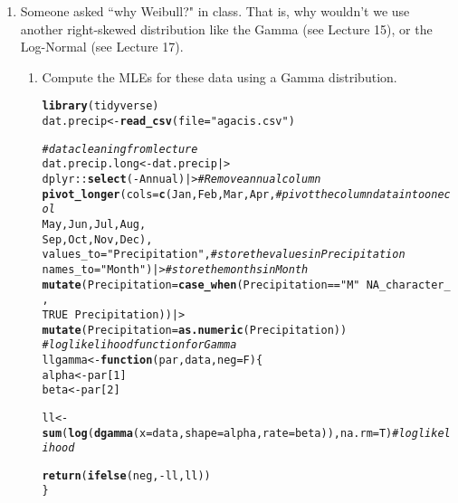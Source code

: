 \documentclass{article}\usepackage[]{graphicx}\usepackage[]{xcolor}
\makeatletter
\newcommand{\hlnum}[1]{\textcolor[rgb]{0.686,0.059,0.569}{#1}}%
\newcommand{\hlsng}[1]{\textcolor[rgb]{0.192,0.494,0.8}{#1}}%
\newcommand{\hlcom}[1]{\textcolor[rgb]{0.678,0.584,0.686}{\textit{#1}}}%
\newcommand{\hlopt}[1]{\textcolor[rgb]{0,0,0}{#1}}%
\newcommand{\hldef}[1]{\textcolor[rgb]{0.345,0.345,0.345}{#1}}%
\newcommand{\hlkwa}[1]{\textcolor[rgb]{0.161,0.373,0.58}{\textbf{#1}}}%
\newcommand{\hlkwb}[1]{\textcolor[rgb]{0.69,0.353,0.396}{#1}}%
\newcommand{\hlkwc}[1]{\textcolor[rgb]{0.333,0.667,0.333}{#1}}%
\newcommand{\hlkwd}[1]{\textcolor[rgb]{0.737,0.353,0.396}{\textbf{#1}}}%
\newenvironment{kframe}{%
 \def\at@end@of@kframe{}%
 \ifinner\ifhmode%
  \def\at@end@of@kframe{\end{minipage}}%
  \begin{minipage}{\columnwidth}%
 \fi\fi%
 \def\FrameCommand##1{\hskip\@totalleftmargin \hskip-\fboxsep
 \colorbox{shadecolor}{##1}\hskip-\fboxsep
     \hskip-\linewidth \hskip-\@totalleftmargin \hskip\columnwidth}%
 \MakeFramed {\advance\hsize-\width
   \@totalleftmargin\z@ \linewidth\hsize
   \@setminipage}}%
 {\par\unskip\endMakeFramed%
 \at@end@of@kframe}
\newenvironment{knitrout}{}{} %
\makeatother
\begin{document}
\begin{enumerate}
  \item Someone asked ``why Weibull?" in class. That is, why wouldn't we use 
  another right-skewed distribution like the Gamma (see Lecture 15), or
  the Log-Normal (see Lecture 17).
  \begin{enumerate}
    \item Compute the MLEs for these data using a Gamma distribution. 
\begin{knitrout}\scriptsize
{}\color{fgcolor}\begin{kframe}
\begin{alltt}
\hlkwd{library}\hldef{(tidyverse)}
\hldef{dat.precip} \hlkwb{<-} \hlkwd{read_csv}\hldef{(}\hlkwc{file} \hldef{=} \hlsng{"agacis.csv"}\hldef{)}

\hlcom{#data cleaning from lecture}
\hldef{dat.precip.long} \hlkwb{<-} \hldef{dat.precip |>}
  \hldef{dplyr}\hlopt{::}\hlkwd{select}\hldef{(}\hlopt{-}\hldef{Annual) |>}                   \hlcom{# Remove annual column }
  \hlkwd{pivot_longer}\hldef{(}\hlkwc{cols} \hldef{=} \hlkwd{c}\hldef{(Jan, Feb, Mar, Apr,}   \hlcom{# pivot the column data into one col}
                        \hldef{May, Jun, Jul, Aug,}
                        \hldef{Sep, Oct, Nov, Dec),}
               \hlkwc{values_to} \hldef{=} \hlsng{"Precipitation"}\hldef{,}   \hlcom{# store the values in Precipitation}
               \hlkwc{names_to} \hldef{=} \hlsng{"Month"}\hldef{) |>}         \hlcom{# store the months in Month}
  \hlkwd{mutate}\hldef{(}\hlkwc{Precipitation} \hldef{=} \hlkwd{case_when}\hldef{(Precipitation} \hlopt{==} \hlsng{"M"} \hlopt{~} \hlnum{NA_character_}\hldef{,}
                                   \hlnum{TRUE}                 \hlopt{~} \hldef{Precipitation))|>}
  \hlkwd{mutate}\hldef{(}\hlkwc{Precipitation} \hldef{=} \hlkwd{as.numeric}\hldef{(Precipitation))}
\hlcom{#log likelihood function for Gamma}
\hldef{llgamma} \hlkwb{<-} \hlkwa{function}\hldef{(}\hlkwc{par}\hldef{,} \hlkwc{data}\hldef{,} \hlkwc{neg}\hldef{=F)\{}
  \hldef{alpha} \hlkwb{<-} \hldef{par[}\hlnum{1}\hldef{]}
  \hldef{beta} \hlkwb{<-} \hldef{par[}\hlnum{2}\hldef{]}

  \hldef{ll} \hlkwb{<-} \hlkwd{sum}\hldef{(}\hlkwd{log}\hldef{(}\hlkwd{dgamma}\hldef{(}\hlkwc{x}\hldef{=data,} \hlkwc{shape}\hldef{=alpha,} \hlkwc{rate}\hldef{=beta)),} \hlkwc{na.rm}\hldef{=T)} \hlcom{#log likelihood}

  \hlkwd{return}\hldef{(}\hlkwd{ifelse}\hldef{(neg,} \hlopt{-}\hldef{ll, ll))}
\hldef{\}}


\end{alltt}
\end{kframe}
\end{knitrout}
\end{enumerate}
\end{enumerate}
\end{document}
